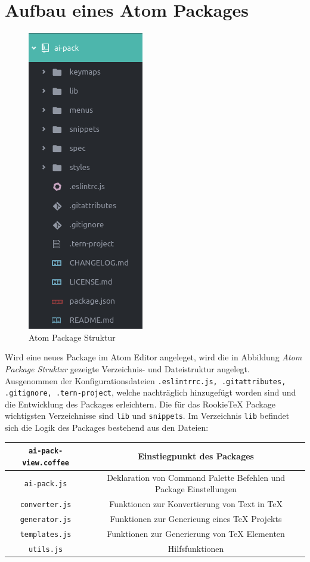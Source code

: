     \section{Aufbau eines Atom Packages}
    \begin{figure}
        \includegraphics[scale=1.0]{img/package_structure.png}
        \caption{Atom Package Struktur}
    \end{figure}
    Wird eine neues Package im Atom Editor angeleget, wird die in Abbildung \textit{Atom Package Struktur} gezeigte Verzeichnis- und Dateistruktur angelegt. Ausgenommen der Konfigurationsdateien \texttt{.eslintrrc.js, .gitattributes, .gitignore, .tern-project}, welche nachträglich hinzugefügt worden sind und die Entwicklung des Packages erleichtern. Die für das RookieTeX Package wichtigsten Verzeichnisse sind \texttt{lib} und \texttt{snippets}. Im Verzeichnis \texttt{lib} befindet sich die Logik des Packages bestehend aus den Dateien:
    \begin{tabular}{ | c | c | }
      \hline
      \texttt{ai-pack-view.coffee} & Einstiegpunkt des Packages \\
      \hline
      \texttt{ai-pack.js} & Deklaration von Command Palette Befehlen und Package Einstellungen \\
      \hline
      \texttt{converter.js} & Funktionen zur Konvertierung von Text in TeX \\
      \hline
      \texttt{generator.js} & Funktionen zur Generieung eines TeX Projekts \\
      \hline
      \texttt{templates.js} & Funktionen zur Generierung von TeX Elementen \\
      \hline
      \texttt{utils.js} & Hilfsfunktionen \\
      \hline
    \end{tabular}

